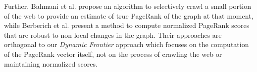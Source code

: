 
Further, Bahmani et al. \cite{rank-bahmani12} propose an algorithm to selectively crawl a small portion of the web to provide an estimate of true PageRank of the graph at that moment, while Berberich et al. \cite{rank-berberich07} present a method to compute normalized PageRank scores that are robust to non-local changes in the graph. Their approaches are orthogonal to our \textit{Dynamic Frontier} approach which focuses on the computation of the PageRank vector itself, not on the process of crawling the web or maintaining normalized scores.






